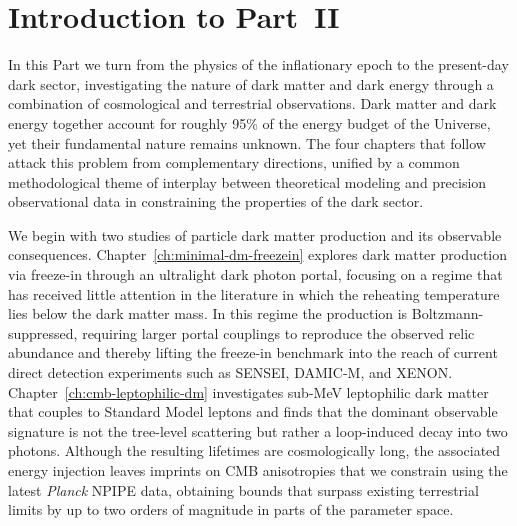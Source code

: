 \chapter*{Introduction to Part~II}
\label{ch:part2-intro}

In this Part we turn from the physics of the inflationary epoch to the present-day dark sector, investigating the nature of dark matter and dark energy through a combination of cosmological and terrestrial observations. Dark matter and dark energy together account for roughly 95\% of the energy budget of the Universe, yet their fundamental nature remains unknown. The four chapters that follow attack this problem from complementary directions, unified by a common methodological theme of interplay between theoretical modeling and precision observational data in constraining the properties of the dark sector.

We begin with two studies of particle dark matter production and its observable consequences. Chapter~\ref{ch:minimal-dm-freezein} explores dark matter production via freeze-in through an ultralight dark photon portal, focusing on a regime that has received little attention in the literature in which the reheating temperature lies below the dark matter mass. In this regime the production is Boltzmann-suppressed, requiring larger portal couplings to reproduce the observed relic abundance and thereby lifting the freeze-in benchmark into the reach of current direct detection experiments such as SENSEI, DAMIC-M, and XENON. Chapter~\ref{ch:cmb-leptophilic-dm} investigates sub-MeV leptophilic dark matter that couples to Standard Model leptons and finds that the dominant observable signature is not the tree-level scattering but rather a loop-induced decay into two photons. Although the resulting lifetimes are cosmologically long, the associated energy injection leaves imprints on CMB anisotropies that we constrain using the latest \textit{Planck} NPIPE data, obtaining bounds that surpass existing terrestrial limits by up to two orders of magnitude in parts of the parameter space.

